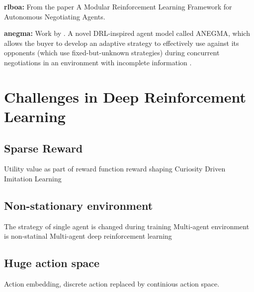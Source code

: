 \textbf{\gls{rlboa}:} From the paper \parencite{Bakker2019RLBOAAM} A Modular Reinforcement Learning Framework for Autonomous Negotiating Agents.

\textbf{\gls{anegma}:} Work by \parencite{bagga2020deep}. A novel DRL-inspired agent model called ANEGMA, which allows the buyer to develop an adaptive strategy to effectively use against its opponents (which use fixed-but-unknown strategies) during concurrent negotiations in an environment with incomplete information . 


\section{Challenges in Deep Reinforcement Learning}

\subsection{Sparse Reward}
Utility value as part of reward function
reward shaping
Curiosity Driven
Imitation Learning

\subsection{Non-stationary environment}
The strategy of single agent is changed during training
Multi-agent environment is non-statinal
Multi-agent deep reinforcement learning 

\subsection{Huge action space}
Action embedding, discrete action replaced by continious action space. 
